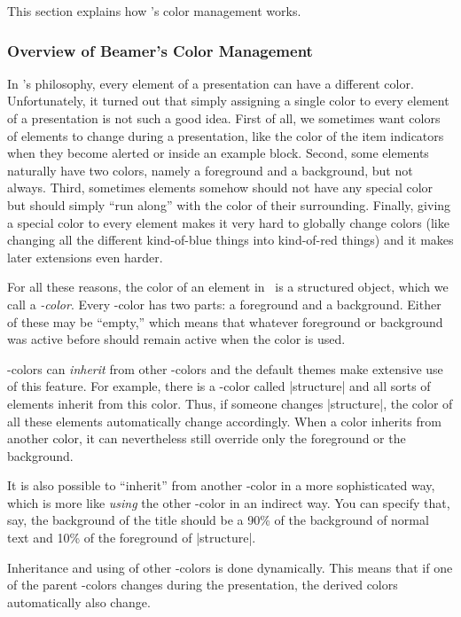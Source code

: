 This section explains how \beamer's color management works.

\subsubsection{Overview of Beamer's Color Management}

In \beamer's philosophy, every element of a presentation can have a different color. Unfortunately, it turned out that simply assigning a single color to every element of a presentation is not such a good idea. First of all, we sometimes want colors of elements to change during a presentation, like the color of the item indicators when they become alerted or inside an example block. Second, some elements naturally have two colors, namely a foreground and a background, but not always. Third, sometimes elements somehow should not have any special color but should simply ``run along'' with the color of their surrounding. Finally, giving a special color to every element makes it very hard to globally change colors (like changing all the different kind-of-blue things into kind-of-red things) and it makes later extensions even harder.

For all these reasons, the color of an element in \beamer\ is a structured object, which we call a \emph{\textsl{\beamer}-color}. Every \beamer-color has two parts: a foreground and a background. Either of these may be ``empty,'' which means that whatever foreground or background was active before should remain active when the color is used.

\beamer-colors can \emph{inherit} from other \beamer-colors and the default themes make extensive use of this feature. For example, there is a \beamer-color called |structure| and all sorts of elements inherit from this color. Thus, if someone changes |structure|, the color of all these elements automatically change accordingly. When a color inherits from another color, it can nevertheless still override only the foreground or the background.

It is also possible to ``inherit'' from another \beamer-color in a more sophisticated way, which is more like \emph{using} the other \beamer-color in an indirect way. You can specify that, say, the background of the title should be a 90\% of the background of normal text and 10\% of the foreground of |structure|.

Inheritance and using of other \beamer-colors is done dynamically. This means that if one of the parent \beamer-colors changes during the presentation, the derived colors automatically also change.

